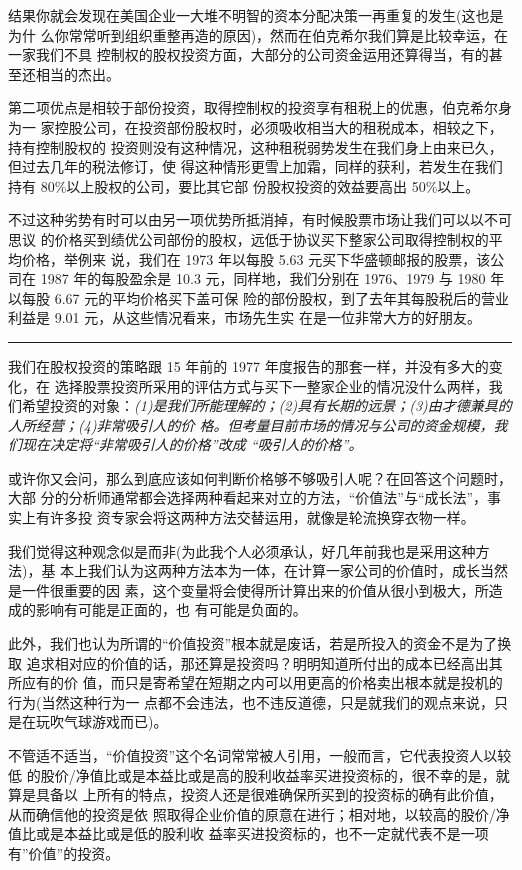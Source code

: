 \documentclass[UTF8,a4paper,zihao=-4,fontset = windows]{ctexart} %
\begin{document}
结果你就会发现在美国企业一大堆不明智的资本分配决策一再重复的发生(这也是为什
么你常常听到组织重整再造的原因)，然而在伯克希尔我们算是比较幸运，在一家我们不具
控制权的股权投资方面，大部分的公司资金运用还算得当，有的甚至还相当的杰出。

第二项优点是相较于部份投资，取得控制权的投资享有租税上的优惠，伯克希尔身为一
家控股公司，在投资部份股权时，必须吸收相当大的租税成本，相较之下，持有控制股权的
投资则没有这种情况，这种租税弱势发生在我们身上由来已久，但过去几年的税法修订，使
得这种情形更雪上加霜，同样的获利，若发生在我们持有 80\%以上股权的公司，要比其它部
份股权投资的效益要高出 50\%以上。

不过这种劣势有时可以由另一项优势所抵消掉，有时候股票市场让我们可以以不可思议
的价格买到绩优公司部份的股权，远低于协议买下整家公司取得控制权的平均价格，举例来
说，我们在 1973 年以每股 5.63 元买下华盛顿邮报的股票，该公司在 1987 年的每股盈余是
10.3 元，同样地，我们分别在 1976、1979 与 1980 年以每股 6.67 元的平均价格买下盖可保
险的部份股权，到了去年其每股税后的营业利益是 9.01 元，从这些情况看来，市场先生实
在是一位非常大方的好朋友。

\rule{10cm}{0.4pt}

我们在股权投资的策略跟 15 年前的 1977 年度报告的那套一样，并没有多大的变化，在
选择股票投资所采用的评估方式与买下一整家企业的情况没什么两样，我们希望投资的对象：\textit{(1)是我们所能理解的；(2)具有长期的远景；(3)由才德兼具的人所经营；(4)非常吸引人的价
格。但考量目前市场的情况与公司的资金规模，我们现在决定将“非常吸引人的价格”改成
“吸引人的价格”。}


或许你又会问，那么到底应该如何判断价格够不够吸引人呢？在回答这个问题时，大部
分的分析师通常都会选择两种看起来对立的方法，“价值法”与“成长法”，事实上有许多投
资专家会将这两种方法交替运用，就像是轮流换穿衣物一样。

我们觉得这种观念似是而非(为此我个人必须承认，好几年前我也是采用这种方法)，基
本上我们认为这两种方法本为一体，在计算一家公司的价值时，成长当然是一件很重要的因
素，这个变量将会使得所计算出来的价值从很小到极大，所造成的影响有可能是正面的，也
有可能是负面的。

此外，我们也认为所谓的“价值投资”根本就是废话，若是所投入的资金不是为了换取
追求相对应的价值的话，那还算是投资吗？明明知道所付出的成本已经高出其所应有的价
值，而只是寄希望在短期之内可以用更高的价格卖出根本就是投机的行为(当然这种行为一
点都不会违法，也不违反道德，只是就我们的观点来说，只是在玩吹气球游戏而已)。

不管适不适当，“价值投资”这个名词常常被人引用，一般而言，它代表投资人以较低
的股价/净值比或是本益比或是高的股利收益率买进投资标的，很不幸的是，就算是具备以
上所有的特点，投资人还是很难确保所买到的投资标的确有此价值，从而确信他的投资是依
照取得企业价值的原意在进行；相对地，以较高的股价/净值比或是本益比或是低的股利收
益率买进投资标的，也不一定就代表不是一项有”价值”的投资。
\end{document}
